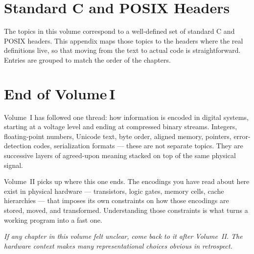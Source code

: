 
\appendix

\chapter{Standard C and POSIX Headers}
\label{app:headers}

\begin{chapterintro}
The topics in this volume correspond to a well-defined set of standard C
and POSIX headers. This appendix maps those topics to the headers where
the real definitions live, so that moving from the text to actual code is
straightforward. Entries are grouped to match the order of the chapters.
\end{chapterintro}


\backmatter
\pagestyle{backmatter}

\chapter*{End of Volume\,I}

Volume~I has followed one thread: how information is encoded in digital
systems, starting at a voltage level and ending at compressed binary
streams. Integers, floating-point numbers, Unicode text, byte order,
aligned memory, pointers, error-detection codes, serialization formats ---
these are not separate topics. They are successive layers of agreed-upon
meaning stacked on top of the same physical signal.

Volume~II picks up where this one ends. The encodings you have read about
here exist in physical hardware --- transistors, logic gates, memory cells,
cache hierarchies --- that imposes its own constraints on how those encodings
are stored, moved, and transformed. Understanding those constraints is what
turns a working program into a fast one.

\medskip
\noindent\textit{If any chapter in this volume felt unclear, come back to it
after Volume~II. The hardware context makes many representational choices
obvious in retrospect.}

\clearpage